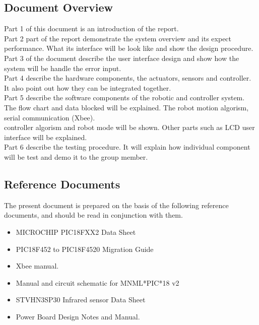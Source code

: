 \documentclass[MTRX3700report.tex]{subfiles}
\begin{document}
\subsection{Document Overview}  

Part 1 of this document is an introduction of the report.\\
Part 2 part of the report demonstrate the system overview and its expect performance. What its interface will be look like and show the design procedure.\\
Part 3 of the document describe the user interface design and show how the system will be handle the error input.\\
Part 4 describe the hardware components, the actuators, sensors and controller. It also point out how they can be integrated together.\\
Part 5 describe the software components of the robotic and controller system. The flow chart and data blocked will be explained. The robot motion algorism, serial communication (Xbee).\\ controller algorism and robot mode will be shown. Other parts such as LCD user interface will be explained.\\
Part 6 describe the testing procedure. It will explain how individual component will be test and demo it to the group member.\\


\subsection{Reference Documents}
The present document is prepared on the basis of the following reference documents, and should be read in conjunction with them.\\
\begin {itemize}
	\item  MICROCHIP PIC18FXX2 Data Sheet
	\item  PIC18F452 to PIC18F4520 Migration Guide
	\item Xbee manual.
	\item Manual and circuit schematic for MNML*PIC*18 v2
	\item STVHN3SP30 Infrared sensor Data Sheet
	\item Power Board Design Notes and Manual.

\end{itemize}
\end{document}

